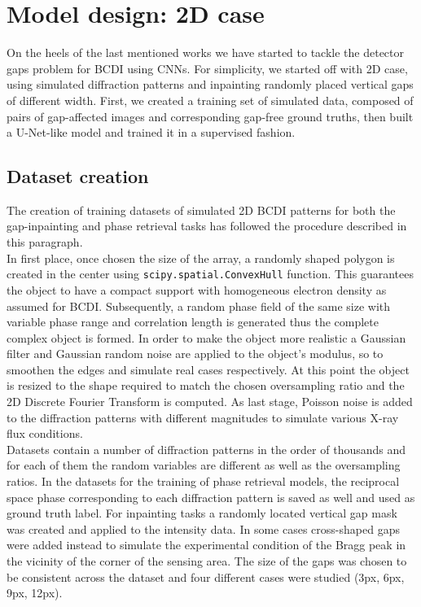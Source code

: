 \section{Model design: 2D case}\label{sec:model}

On the heels of the last mentioned works we have started to tackle the detector gaps problem for BCDI using CNNs. For simplicity, we started off with 2D
case, using simulated diffraction patterns and inpainting randomly placed vertical gaps of different width. First, we created a training set of 
simulated data, composed of pairs of gap-affected images and corresponding gap-free ground truths, then built a U-Net-like model and trained it 
in a supervised fashion.

\subsection{Dataset creation}\label{sec:dataset_creation}

The creation of training datasets of simulated 2D BCDI patterns for both the gap-inpainting and phase retrieval tasks has followed the procedure
described in this paragraph.\\
In first place, once chosen the size of the array, a randomly shaped polygon is created in the center using \texttt{scipy.spatial.ConvexHull} 
function. This guarantees the object to have a compact support with homogeneous electron density as assumed for BCDI. Subsequently, 
a random phase field of the same size with variable phase range and correlation length is generated thus the complete complex object is formed.
In order to make the object more realistic a Gaussian filter and Gaussian random noise are applied to the object's modulus, so to smoothen the edges 
and simulate real cases respectively. At this point the object is resized to the shape required to match the chosen oversampling ratio and the 2D
Discrete Fourier Transform is computed. As last stage, Poisson noise is added to the diffraction patterns with different magnitudes to simulate 
various X-ray flux conditions. \\
Datasets contain a number of diffraction patterns in the order of thousands and for each of them the random variables are different as well as the 
oversampling ratios. In the datasets for the training of phase retrieval models, the reciprocal space phase corresponding to each diffraction pattern
is saved as well and used as ground truth label. 
For inpainting tasks a randomly located vertical gap mask was created and applied to the intensity data. In some cases cross-shaped gaps were 
added instead to simulate the experimental condition of the Bragg peak in the vicinity of the corner of the sensing area. 
The size of the gaps was chosen to be consistent across the dataset and four different cases were studied (3px, 6px, 9px, 12px).

